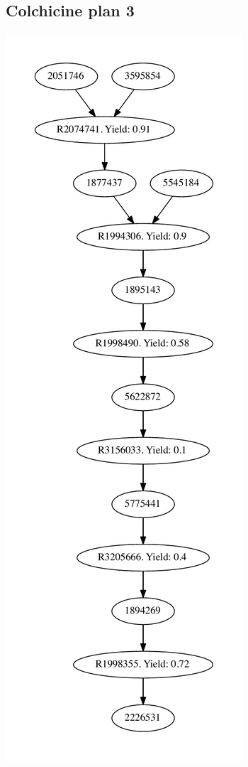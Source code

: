 \documentclass[a4paper,10pt,titlepage]{paper}
\begin{document}
\subsection{Colchicine plan 3}
\centering
\includegraphics[scale=0.4]{Synteseplaner/Colchicine/plan3.pdf}
\label{Appendix::Colchicine3}
\end{document}
